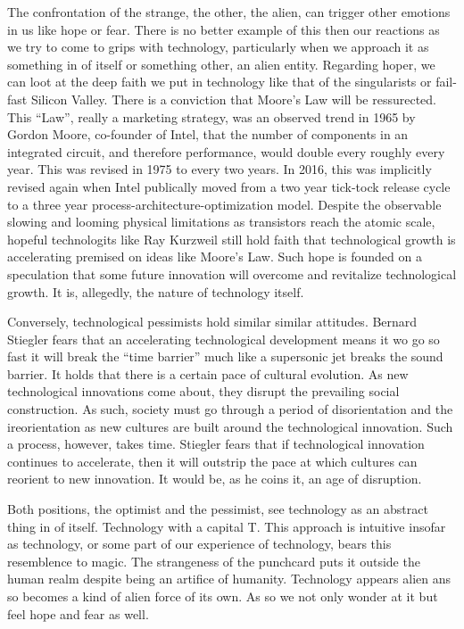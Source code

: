 \documentclass{article}
\begin{document}
The confrontation of the strange, the other, the alien, can trigger other
emotions in us like hope or fear.
There is no better example of this then our reactions as we try to come to grips
with technology, particularly when we approach it as something in of itself or
something other, an alien entity.
Regarding hoper, we can loot at the deep faith we put in technology like that of
the singularists or fail-fast Silicon Valley.
There is a conviction that Moore's Law will be ressurected.
This ``Law'', really a marketing strategy, was an observed trend in 1965 by
Gordon Moore, co-founder of Intel, that the number of components in an
integrated circuit, and therefore performance, would double every roughly every
year.
This was revised in 1975 to every two years.
In 2016, this was implicitly revised again when Intel publically moved from a two 
year tick-tock release cycle to a three year process-architecture-optimization
model.
Despite the observable slowing and looming physical limitations as transistors
reach the atomic scale, hopeful technologits like Ray Kurzweil still hold faith
that technological growth is accelerating premised on ideas like Moore's Law.
Such hope is founded on a speculation that some future innovation will overcome
and revitalize technological growth.
It is, allegedly, the nature of technology itself.

Conversely, technological pessimists hold similar similar attitudes.
Bernard Stiegler fears that an accelerating technological development means it
wo go so fast it will break the ``time barrier'' much like a supersonic jet
breaks the sound barrier.
It holds that there is a certain pace of cultural evolution.
As new technological innovations come about, they disrupt the prevailing social
construction.
As such, society must go through a period of disorientation and the
ireorientation as new cultures are built around the technological innovation.
Such a process, however, takes time.
Stiegler fears that if technological innovation continues to accelerate, then it
will outstrip the pace at which cultures can reorient to new innovation.
It would be, as he coins it, an age of disruption.

Both positions, the optimist and the pessimist, see technology as an abstract
thing in of itself.
Technology with a capital T.
This approach is intuitive insofar as technology, or some part of our
experience of technology, bears this resemblence to magic.
The strangeness of the punchcard puts it outside the human realm despite being
an artifice of humanity.
Technology appears alien ans so becomes a kind of alien force of its own.
As so we not only wonder at it but feel hope and fear as well.
\end{document}
